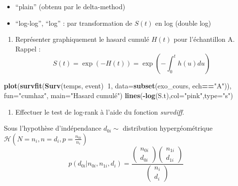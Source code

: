 \documentclass[
]{article}
\newenvironment{Shaded}{\begin{snugshade}}{\end{snugshade}}
\newcommand{\DataTypeTok}[1]{\textcolor[rgb]{0.13,0.29,0.53}{#1}}
\newcommand{\DecValTok}[1]{\textcolor[rgb]{0.00,0.00,0.81}{#1}}
\newcommand{\KeywordTok}[1]{\textcolor[rgb]{0.13,0.29,0.53}{\textbf{#1}}}
\newcommand{\NormalTok}[1]{#1}
\newcommand{\OperatorTok}[1]{\textcolor[rgb]{0.81,0.36,0.00}{\textbf{#1}}}
\newcommand{\StringTok}[1]{\textcolor[rgb]{0.31,0.60,0.02}{#1}}
\providecommand{\tightlist}{%
  \setlength{\itemsep}{0pt}\setlength{\parskip}{0pt}}
\begin{document}
\begin{itemize}
\tightlist
\item
  ``plain'' (obtenu par le delta-method)
\item
  ``log-log'', ``log'' : par transformation de \(S(t)\) en log (double
  log)
\end{itemize}

\begin{enumerate}
\def\labelenumi{\arabic{enumi})}
\setcounter{enumi}{5}
\tightlist
\item
  Représenter graphiquement le hasard cumulé \(H(t)\) pour l'échantillon
  A. Rappel :
  \[S(t) = \exp \left(-H(t)\right) = \exp \left(-\int_{0}^{t} h(u)du \right)\]
\end{enumerate}

\begin{Shaded}
\begin{Highlighting}[]
\KeywordTok{plot}\NormalTok{(}\KeywordTok{survfit}\NormalTok{(}\KeywordTok{Surv}\NormalTok{(temps, event)}\OperatorTok{~}\DecValTok{1}\NormalTok{, }
             \DataTypeTok{data=}\KeywordTok{subset}\NormalTok{(exo_cours, ech}\OperatorTok{==}\StringTok{"A"}\NormalTok{)), }
             \DataTypeTok{fun=}\StringTok{"cumhaz"}\NormalTok{, }\DataTypeTok{main=}\StringTok{"Hasard cumulé"}\NormalTok{)}
\KeywordTok{lines}\NormalTok{(}\OperatorTok{-}\KeywordTok{log}\NormalTok{(S.t),}\DataTypeTok{col=}\StringTok{"pink"}\NormalTok{,}\DataTypeTok{type=}\StringTok{"s"}\NormalTok{)}
\end{Highlighting}
\end{Shaded}

\begin{enumerate}
\def\labelenumi{\arabic{enumi})}
\setcounter{enumi}{6}
\tightlist
\item
  Effectuer le test de log-rank à l'aide du fonction \textit{survdiff}.
\end{enumerate}

Sous l'hypothèse d'indépendance \(d_{0i} \sim\) distribution
hypergéométrique
\(\mathcal{H}\left(N = n_i, n = d_i, p = \frac{n_{0i}}{n_i} \right)\) \[
p(d_{0i}|n_{0i},n_{1i},d_i) = \frac{\begin{pmatrix}n_{0i} \\ d_{0i}\end{pmatrix}\begin{pmatrix}n_{1i} \\ d_{1i}\end{pmatrix}}{\begin{pmatrix}n_{i} \\ d_{i}\end{pmatrix}} 
\]
\end{document}
